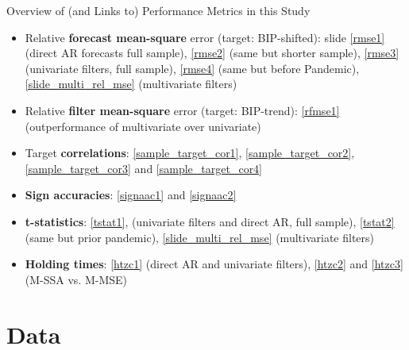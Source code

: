 \documentclass{beamer}
\begin{document}
\begin{frame} {Overview of (and Links to) Performance Metrics in this Study}
\begin{itemize}
\item Relative \textbf{forecast mean-square} error (target: BIP-shifted): slide \eqref{rmse1} (direct AR forecasts full sample), \eqref{rmse2} (same but shorter sample), \eqref{rmse3} (univariate filters, full sample), \eqref{rmse4} (same but before Pandemic), \eqref{slide_multi_rel_mse} (multivariate filters) 

\item Relative \textbf{filter mean-square} error (target: BIP-trend): \eqref{rfmse1} (outperformance of multivariate over univariate)

\item Target \textbf{correlations}: \eqref{sample_target_cor1}, \eqref{sample_target_cor2}, \eqref{sample_target_cor3} and \eqref{sample_target_cor4} 

\item \textbf{Sign accuracies}: \eqref{signaac1} and \eqref{signaac2}

\item \textbf{t-statistics}: \eqref{tstat1},  (univariate filters and direct AR, full sample), \eqref{tstat2} (same but prior pandemic), \eqref{slide_multi_rel_mse} (multivariate filters)

\item \textbf{Holding times}: \eqref{htzc1} (direct AR and univariate filters), \eqref{htzc2} and \eqref{htzc3} (M-SSA vs. M-MSE)
\end{itemize}
\end{frame}




\section{Data}

\frame{\sectionpage}
\end{document}
